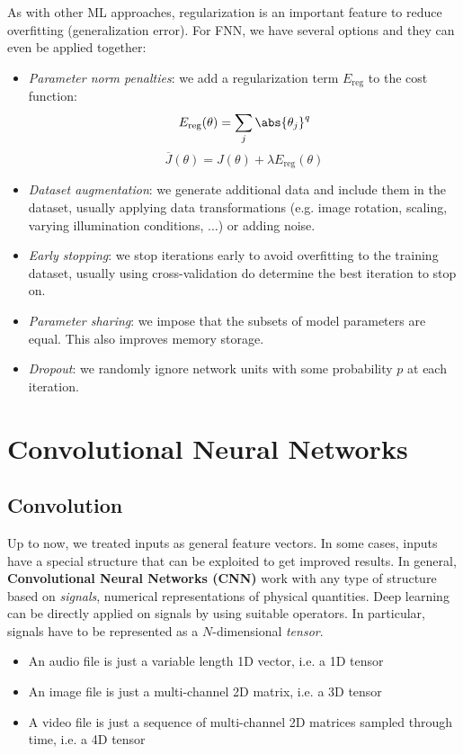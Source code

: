 \documentclass[a4paper, 12pt]{report}
\begin{document}
    As with other ML approaches, regularization is an important feature to reduce overfitting (generalization error). For FNN, we have several options and they can even be applied together:
    \begin{itemize}
        \item \textit{Parameter norm penalties}: we add a regularization term $E_{\mathrm{reg}}$ to the cost function:
        \[E_{\mathrm{reg}}(\theta) = \sum_j \abs{\theta_j}^{q}\]
        \[\overline{J}(\theta) = J(\theta) + \lambda E_{\mathrm{reg}}(\theta)\]
        \item \textit{Dataset augmentation}: we generate additional data and include them in the dataset, usually applying data transformations (e.g. image rotation, scaling, varying illumination conditions, ...) or adding noise.
        \item \textit{Early stopping}: we stop iterations early to avoid overfitting to the training dataset, usually using cross-validation do determine the best iteration to stop on. 
        \item \textit{Parameter sharing}: we impose that the subsets of model parameters are equal. This also improves memory storage.
        \item \textit{Dropout}: we randomly ignore network units with some probability $p$ at each iteration.
    \end{itemize}

    \section{Convolutional Neural Networks}

    \subsection{Convolution}

    Up to now, we treated inputs as general feature vectors. In some cases, inputs have a special structure that can be exploited to get improved results. In general, \textbf{Convolutional Neural Networks (CNN)} work with any type of structure based on \textit{signals}, numerical representations of physical quantities. Deep learning can be directly applied on signals by using suitable operators. In particular, signals have to be represented as a $N$-dimensional \textit{tensor}.
    \begin{itemize}
        \item An audio file is just a variable length 1D vector, i.e. a 1D tensor
        \item An image file is just a multi-channel 2D matrix, i.e. a 3D tensor
        \item A video file is just a sequence of multi-channel 2D matrices sampled through time, i.e. a 4D tensor
    \end{itemize}
\end{document}
